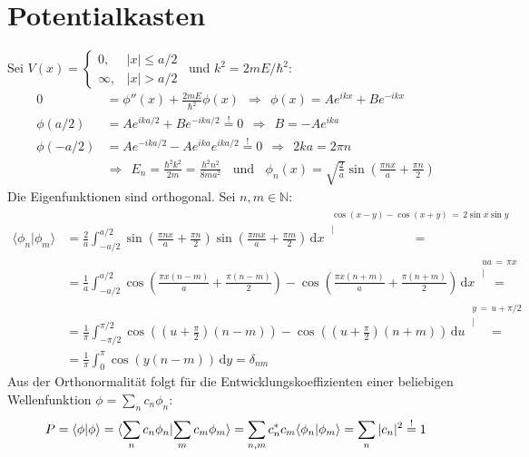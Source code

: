 \documentclass[a4paper,12pt]{article}
\newcommand{\kom}{}
\newcommand{\brak}{}
\newcommand{\intx}{}
\newcommand{\kla}{}
\begin{document}
\section{Potentialkasten}
Sei $V(x)=\left\{\begin{matrix}
0,& |x|\le a/2 \\ \infty,& |x|>a/2
\end{matrix}\right.$\, und $k^2=2mE/\hbar^2$:
\begin{align*}
0&=\phi''(x)+\frac{2mE}{\hbar^2}\phi(x)\ \ \Rightarrow\ \ \phi(x)=Ae^{ikx}+Be^{-ikx}\\
\phi (a/2)&=Ae^{ika/2}+Be^{-ika/2}\overset{!}{=}0 \ \ \Rightarrow\ \ B=-Ae^{ika} \\ 
\phi (-a/2)&=Ae^{-ika/2}-Ae^{ika}e^{ika/2}\overset{!}{=}0 \ \ \Rightarrow\ \ 2ka=2\pi n\\
&\Rightarrow\ \ E_n=\frac{\hbar^2k^2}{2m}=\frac{h^2n^2}{8ma^2}\ \ \ \ \mathrm{und}\ \ \ \ \phi_n(x)=\sqrt{\frac{2}{a}}\sin\kla\left( {\frac{\pi nx}{a}+\frac{\pi n}{2}} \right)  
\end{align*}
Die Eigenfunktionen sind orthogonal. Sei $n, m\in \mathbb{N}$:
\begin{align*}
\brak\langle {\phi_n}| {\phi_m}\rangle &= \frac{2}{a}\intx\int_{-a/2}^{a/2}\sin\kla\left( {\frac{\pi nx}{a}+\frac{\pi n}{2}} \right)\sin\kla\left( {\frac{\pi mx}{a}+\frac{\pi m}{2}} \right)\,\mathrm{d}x \kom\overset{\substack{{\cos(x-y)-\cos(x+y)\, =\, 2\sin x\sin y} \\ |}}{=} \\
&=\frac{1}{a}\intx\int_{-a/2}^{a/2}\cos\kla\left( {\frac{\pi x(n-m)}{a}+\frac{\pi(n-m)}{2}} \right) -\cos\kla\left( {\frac{\pi x(n+m)}{a}+\frac{\pi (n+m)}{2}} \right) \,\mathrm{d}x \kom\overset{\substack{{ua\,=\,\pi x} \\ |}}{=}\\
&=\frac{1}{\pi}\intx\int_{-\pi/2}^{\pi/2}\cos\kla\left( {(u+\frac{\pi}{2})(n-m)} \right) -\cos\kla\left( {(u+\frac{\pi}{2})(n+m)} \right) \,\mathrm{d}u \kom\overset{\substack{{y\,=\,u+\pi/2} \\ |}}{=}\\
&=\frac{1}{\pi}\intx\int_{0}^{\pi}\cos\kla\left( {y(n-m)} \right) \,\mathrm{d}y =\delta_{nm}
\end{align*}
Aus der Orthonormalität folgt für die Entwicklungskoeffizienten einer beliebigen Wellenfunktion $\phi=\sum_nc_n\phi_n$:
$$P=\brak\langle {\phi}| {\phi}\rangle =\brak\langle {\sum_n c_n\phi_n}| {\sum_m c_m\phi_m}\rangle =\sum_{n,m}c_n^\ast c_m\brak\langle {\phi_n}| {\phi_m}\rangle =\sum_n |c_n|^2\overset{!}{=}1\\$$
\end{document}
